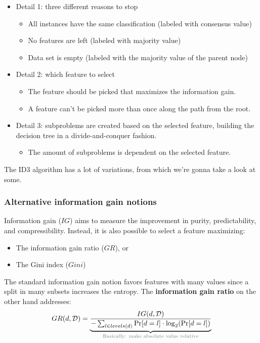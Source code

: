 \begin{itemize}
  \item Detail 1: three different reasons to stop
  \begin{itemize}
    \item All instances have the same classification (labeled with consensus value)
    \item No features are left (labeled with majority value)
    \item Data set is empty (labeled with the majority value of the parent node)
  \end{itemize}
  \item Detail 2: which feature to select
  \begin{itemize}
    \item The feature should be picked that maximizes the information gain. 
    \item A feature can't be picked more than once along the path from the root.
  \end{itemize}
  \item Detail 3: subproblems are created based on the selected feature, building the decision tree in a divide-and-conquer fashion.
  \begin{itemize}
    \item The amount of subproblems is dependent on the selected feature.
  \end{itemize}
\end{itemize}

The ID3 algorithm has a lot of variations, from which we're gonna take a look at some.

\subsubsection*{Alternative information gain notions}
Information gain ($IG$) aims to measure the improvement in purity, predictability, and compressibility. Instead, it is also possible to select a feature maximizing:
\begin{itemize}
  \item The information gain ratio ($GR$), or
  \item The Gini index ($Gini$)
\end{itemize}

The standard information gain notion favors features with many values since a split in many subsets increases the entropy. The \textbf{information gain ratio} on the other hand addresses:
\begin{align*}
  GR(d, \mathcal{D}) = \underbrace{\frac{IG(d, \mathcal{D})}{-\sum_{l\in levels(d)} \Pr[d=l]\cdot\log_2(\Pr[d=l])}}_{\text{\color{gray}Basically: make absolute value relative}}
\end{align*}

